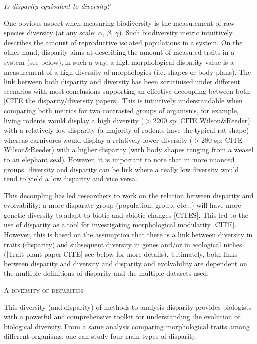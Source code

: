 \documentclass[12pt,letterpaper]{article}
\renewcommand{\section}[1]{%
\bigskip
\begin{center}
\begin{Large}
\normalfont\scshape #1
\medskip
\end{Large}
\end{center}}
\renewcommand{\subsection}[1]{%
\bigskip
\begin{center}
\begin{large}
\normalfont\itshape #1
\end{large}
\end{center}}
\begin{document}
\subsection{Is disparity equivalent to diversity?}
One obvious aspect when measuring biodiversity is the measurement of raw species diversity (at any scale; $\alpha$, $\beta$, $\gamma$).
Such biodiversity metric intuitively describes the amount of reproductive isolated populations in a system.
On the other hand, disparity aims at describing the amount of measured traits in a system (see below), in such a way, a high morphological disparity value is a measurement of a high diversity of morphologies (i.e. shapes or body plans).
The link between both disparity and diversity has been scrutinised under different scenarios with most conclusions supporting an effective decoupling between both [CITE the disparity/diversity papers].
This is intuitively understandable when comparing both metrics for two contrasted groups of organisms, for example, living rodents would display a high diversity ($>$2200 sp; CITE Wilson\&Reeder) with a relatively low disparity (a majority of rodents have the typical rat shape) whereas carnivores would display a relatively lower diversity ($>$280 sp; CITE Wilson\&Reeder) with a higher disparity (with body shapes ranging from a weasel to an elephant seal).
However, it is important to note that in more nuanced groups, diversity and disparity can be link where a really low diversity would tend to yield a low disparity and vice versa.

This decoupling has led researchers to work on the relation between disparity and evolvability: a more disparate group (population, group, etc...) will have more genetic diversity to adapt to biotic and abiotic changes [CITES].
This led to the use of disparity as a tool for investigating morphological modularity [CITE].
However, this is based on the assumption that there is a link between diversity in traits (disparity) and subsequent diversity in genes and/or in ecological niches ([Trait plant paper CITE] see below for more details).
Ultimately, both links between disparity and diversity and disparity and evolvability are dependent on the multiple definitions of disparity and the multiple datasets used. 


\section{A diversity of disparities}
This diversity (and disparity) of methods to analysis disparity provides biologists with a powerful and comprehensive toolkit for understanding the evolution of biological diversity.
From a same analysis comparing morphological traits among different organisms, one can study four main types of disparity:
\end{document}
